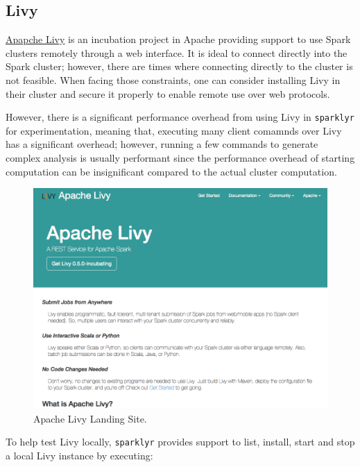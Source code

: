 \documentclass[]{book}
\theoremstyle{definition}
\theoremstyle{definition}
\theoremstyle{definition}
\theoremstyle{remark}
\begin{document}
\hypertarget{clusters-livy}{%
\subsection{Livy}\label{clusters-livy}}

\href{https://livy.incubator.apache.org/}{Apapche Livy} is an incubation
project in Apache providing support to use Spark clusters remotely
through a web interface. It is ideal to connect directly into the Spark
cluster; however, there are times where connecting directly to the
cluster is not feasible. When facing those constraints, one can consider
installing Livy in their cluster and secure it properly to enable remote
use over web protocols.

However, there is a significant performance overhead from using Livy in
\texttt{sparklyr} for experimentation, meaning that, executing many
client comamnds over Livy has a significant overhead; however, running a
few commands to generate complex analysis is usually performant since
the performance overhead of starting computation can be insignificant
compared to the actual cluster computation.

\begin{figure}

{\centering \includegraphics[width=13.78in]{images/05-clusters-apache-livy} 

}

\caption{Apache Livy Landing Site.}\label{fig:apache-livy}
\end{figure}

To help test Livy locally, \texttt{sparklyr} provides support to list,
install, start and stop a local Livy instance by executing:
\end{document}
